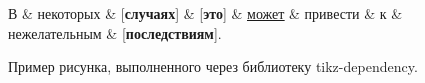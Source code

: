 \documentclass[a4paper, 14pt]{extreport}
\begin{document}
\begin{figure}[H]
    \centering
    \small
    \begin{dependency}
        \begin{deptext}[column sep=0em]
            В \& некоторых \& {}[\textbf{случаях}] \& {}{[\textbf{это}]} \& \underline{\underline{может}} \& привести \& к \& нежелательным \& {}[\textbf{последствиям}]. \\
        \end{deptext}
    \end{dependency}
    \caption{Пример рисунка, выполненного через библиотеку tikz-dependency.}
    \label{fig:example fig 5}
\end{figure}
\end{document}
